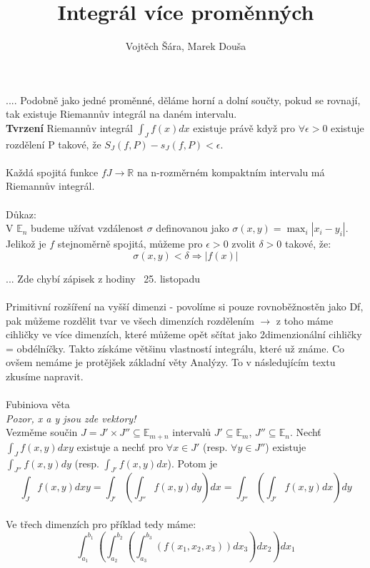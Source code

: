 \documentclass{article}
\title{Integrál více proměnných}
\author{Vojtěch Šára, Marek Douša}
\begin{document}
\maketitle
....
Podobně jako jedné proměnné, děláme horní a dolní součty, pokud se rovnají, tak existuje Riemannův integrál na daném intervalu.\\
\textbf{Tvrzení} Riemannův integrál $\int_{J}f(x)dx$ existuje právě když pro $\forall \epsilon > 0$ existuje rozdělení P takové, že $S_{J}(f,P) - s_{J}(f,P) < \epsilon$.\\\\

Každá spojitá funkce $f J \rightarrow \mathbb{R}$ na n-rozměrném kompaktním intervalu má Riemannův integrál.\\\\

Důkaz:\\
V $\mathbb{E}_{n}$ budeme užívat vzdálenost $\sigma$ definovanou jako $\sigma (x,y) = \max_{i} |x_{i} - y_{i}|$. Jelikož je $f$ stejnoměrně spojitá, můžeme pro $\epsilon > 0$ 
zvolit $\delta > 0$ takové, že:
$$\sigma (x,y) < \delta \Rightarrow |f(x)|$$



... Zde chybí zápisek z hodiny ~25. listopadu\\\\


Primitivní rozšíření na vyšší dimenzi - povolíme si pouze rovnoběžnostěn jako Df, pak můžeme rozdělit tvar ve všech dimenzích rozdělením $\rightarrow$ z toho máme cihličky
ve více dimenzích, které můžeme opět sčítat jako 2dimenzionální cihličky = obdélníčky. Takto získáme většinu vlastností integrálu, které už známe. Co ovšem nemáme je
protějšek základní věty Analýzy. To v následujícím textu zkusíme napravit.\\\\

Fubiniova věta\\
\textit{Pozor, x a y jsou zde vektory!}\\
Vezměme součin $J = J' \times J'' \subseteq \mathbb{E}_{m+n}$ intervalů $J' \subseteq \mathbb{E}_{m}$, $J'' \subseteq \mathbb{E}_{n}$. Nechť $\int_{J}f(x,y)dxy$ existuje a
nechť pro $\forall x \in J'$ (resp. $\forall y \in J''$) existuje $\int_{J''}f(x,y)dy$ (resp. $\int_{J'}f(x,y)dx$). Potom je
$$\int_{J}f(x,y)dxy = \int_{J'}(\int_{J''}f(x,y)dy)dx = \int_{J''}(\int_{J'}f(x,y)dx)dy $$\\

Ve třech dimenzích pro příklad tedy máme:
$$\int_{a_{1}}^{b_{1}}( \int_{a_{2}}^{b_{2}}( \int_{a_{3}}^{b_{3}}( f(x_{1},x_{2},x_{3}))dx_{3} )dx_{2} )dx_{1}$$\\
\end{document}
